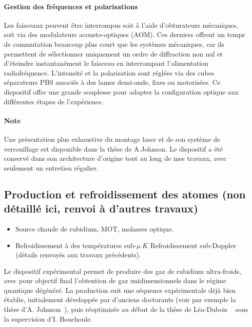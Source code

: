 \paragraph{Gestion des fréquences et polarisations}
Les faisceaux peuvent être interrompus soit à l’aide d’obturateurs mécaniques, soit via des modulateurs acousto-optiques (AOM). Ces derniers offrent un temps de commutation beaucoup plus court que les systèmes mécaniques, car ils permettent de sélectionner uniquement un ordre de diffraction non nul et d’éteindre instantanément le faisceau en interrompant l’alimentation radiofréquence. L’intensité et la polarisation sont réglées via des cubes séparateurs PBS associés à des lames demi-onde, fixes ou motorisées. Ce dispositif offre une grande souplesse pour adapter la configuration optique aux différentes étapes de l’expérience.


\paragraph{Note}
Une présentation plus exhaustive du montage laser et de son système de verrouillage est disponible dans la thèse de A.Johnson\cite{Johnson2016}. Le dispositif a été conservé dans son architecture d’origine tout au long de mes travaux, avec seulement un entretien régulier.


\subsection{Production et refroidissement des atomes (non détaillé ici, renvoi à d'autres travaux)}
{\color{blue}
\begin{itemize}
    \item Source chaude de rubidium, MOT, molasses optique.
    \item Refroidissement à des températures sub-$\mu~K$ Refroidissement sub-Doppler (détails renvoyés aux travaux précédents).
\end{itemize}
}
Le dispositif expérimental permet de produire des gaz de rubidium ultra-froids, avec pour objectif final l’obtention de gaz unidimensionnels dans le régime quantique dégénéré. La production suit une séquence expérimentale déjà bien établie, initialement développée par d’anciens doctorants (voir par exemple la thèse d’A. Johnson~\cite{Johnson2016}), puis réoptimisée au début de la thèse de Léa-Dubois ~\cite{L.Dubois2024} sous la supervision d’I. Bouchoule.

